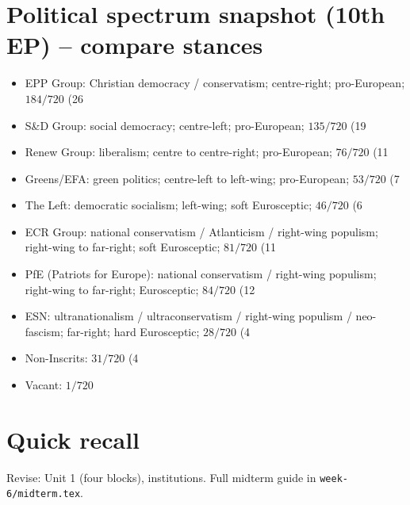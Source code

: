 \documentclass[10pt,a4paper]{article}
\begin{document}
\section*{\color{eublue}Political spectrum snapshot (10th EP) -- compare stances}
\begin{itemize}
\item EPP Group: Christian democracy / conservatism; centre-right; pro-European; $184/720$ (26%
\item S\&D Group: social democracy; centre-left; pro-European; $135/720$ (19%
\item Renew Group: liberalism; centre to centre-right; pro-European; $76/720$ (11%
\item Greens/EFA: green politics; centre-left to left-wing; pro-European; $53/720$ (7%
\item The Left: democratic socialism; left-wing; soft Eurosceptic; $46/720$ (6%
\item ECR Group: national conservatism / Atlanticism / right-wing populism; right-wing to far-right; soft Eurosceptic; $81/720$ (11%
\item PfE (Patriots for Europe): national conservatism / right-wing populism; right-wing to far-right; Eurosceptic; $84/720$ (12%
\item ESN: ultranationalism / ultraconservatism / right-wing populism / neo-fascism; far-right; hard Eurosceptic; $28/720$ (4%
\item Non-Inscrits: $31/720$ (4%
\item Vacant: $1/720$
\end{itemize}

\section*{Quick recall}
Revise: Unit 1 (four blocks), institutions. Full midterm guide in \texttt{week-6/midterm.tex}.
\end{document}
